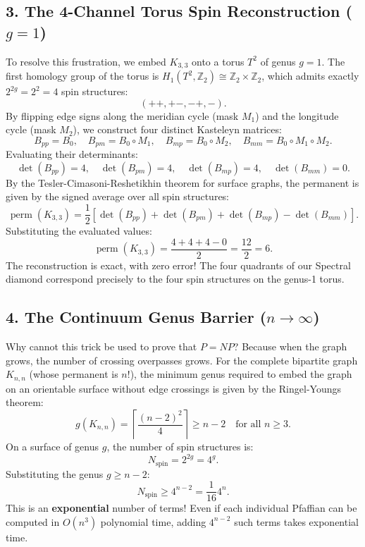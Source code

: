 \documentclass[11pt,a4paper]{article}
\theoremstyle{definition}
\begin{document}
\subsection{3. The 4-Channel Torus Spin Reconstruction ($g = 1$)}
To resolve this frustration, we embed $K_{3,3}$ onto a torus $T^2$ of genus $g = 1$. The first homology group of the torus is $H_1(T^2, \mathbb{Z}_2) \cong \mathbb{Z}_2 \times \mathbb{Z}_2$, which admits exactly $2^{2g} = 2^2 = 4$ spin structures:
\begin{equation}
(++, +-, -+,  - ).
\end{equation}
By flipping edge signs along the meridian cycle (mask $M_1$) and the longitude cycle (mask $M_2$), we construct four distinct Kasteleyn matrices:
\begin{equation}
B_{pp} = B_0, \quad B_{pm} = B_0 \circ M_1, \quad B_{mp} = B_0 \circ M_2, \quad B_{mm} = B_0 \circ M_1 \circ M_2.
\end{equation}
Evaluating their determinants:
\begin{equation}
\det(B_{pp}) = 4, \quad \det(B_{pm}) = 4, \quad \det(B_{mp}) = 4, \quad \det(B_{mm}) = 0.
\end{equation}
By the Tesler-Cimasoni-Reshetikhin theorem for surface graphs, the permanent is given by the signed average over all spin structures:
\begin{equation}
\operatorname{perm}(K_{3,3}) = \frac{1}{2} \left[ \det(B_{pp}) + \det(B_{pm}) + \det(B_{mp}) - \det(B_{mm}) \right].
\end{equation}
Substituting the evaluated values:
\begin{equation}
\operatorname{perm}(K_{3,3}) = \frac{4 + 4 + 4 - 0}{2} = \frac{12}{2} = 6.
\end{equation}
The reconstruction is exact, with zero error! The four quadrants of our Spectral diamond correspond precisely to the four spin structures on the genus-1 torus.

\subsection{4. The Continuum Genus Barrier ($n \to \infty$)}
Why cannot this trick be used to prove that $P = NP$?
Because when the graph grows, the number of crossing overpasses grows. For the complete bipartite graph $K_{n,n}$ (whose permanent is $n!$), the minimum genus required to embed the graph on an orientable surface without edge crossings is given by the Ringel-Youngs theorem:
\begin{equation}
g(K_{n,n}) = \left\lceil \frac{(n-2)^2}{4} \right\rceil \ge n - 2 \quad \text{for all } n \ge 3.
\end{equation}
On a surface of genus $g$, the number of spin structures is:
\begin{equation}
N_{\mathrm{spin}} = 2^{2g} = 4^g.
\end{equation}
Substituting the genus $g \ge n - 2$:
\begin{equation}
N_{\mathrm{spin}} \ge 4^{n-2} = \frac{1}{16} 4^n.
\end{equation}
This is an \textbf{exponential} number of terms! Even if each individual Pfaffian can be computed in $O(n^3)$ polynomial time, adding $4^{n-2}$ such terms takes exponential time.
\end{document}
